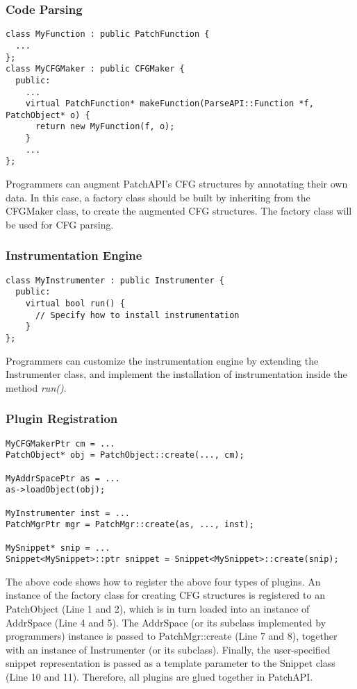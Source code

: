 \subsubsection{Code Parsing}
\lstset{numbers=left}
\begin{lstlisting}
class MyFunction : public PatchFunction {
  ...
};
class MyCFGMaker : public CFGMaker {
  public:
    ...
    virtual PatchFunction* makeFunction(ParseAPI::Function *f, PatchObject* o) {
      return new MyFunction(f, o);
    }
    ...
};
\end{lstlisting}
Programmers can augment PatchAPI's CFG structures by annotating their own data.
In this case, a factory class should be built by inheriting from the
CFGMaker class, to create the augmented CFG structures. The factory class will
be used for CFG parsing.

\subsubsection{Instrumentation Engine}
\lstset{numbers=left}
\begin{lstlisting}
class MyInstrumenter : public Instrumenter {
  public:
    virtual bool run() {
      // Specify how to install instrumentation
    }
};
\end{lstlisting}
Programmers can customize the instrumentation engine by extending the
Instrumenter class, and implement the installation of instrumentation inside the
method \emph{run()}.

\subsubsection{Plugin Registration}
\lstset{numbers=left}
\begin{lstlisting}
MyCFGMakerPtr cm = ...
PatchObject* obj = PatchObject::create(..., cm);

MyAddrSpacePtr as = ...
as->loadObject(obj);

MyInstrumenter inst = ...
PatchMgrPtr mgr = PatchMgr::create(as, ..., inst);

MySnippet* snip = ...
Snippet<MySnippet>::ptr snippet = Snippet<MySnippet>::create(snip);
\end{lstlisting}
The above code shows how to register the above four types of plugins.  An
instance of the factory class for creating CFG structures is registered to an
PatchObject (Line 1 and 2), which is in turn loaded into an instance of
AddrSpace (Line 4 and 5). The AddrSpace (or its subclass implemented by
programmers) instance is passed to PatchMgr::create (Line 7 and 8), together
with an instance of Instrumenter (or its subclass). Finally, the user-specified
snippet representation is passed as a template parameter to the Snippet
class (Line 10 and 11). Therefore, all plugins are glued together in PatchAPI.
